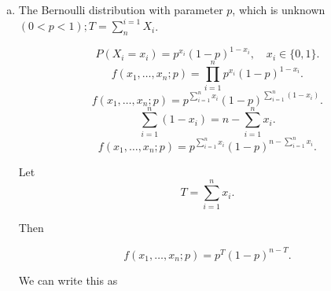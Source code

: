 \documentclass{article}
\begin{document}
\begin{enumerate}[(a)]
	\item The Bernoulli distribution with parameter $p$, which is unknown $(0<p<1); T= \sum_{n}^{i=1}X_i$.

	      \[
		      P(X_i = x_i) = p^{x_i}(1-p)^{1-x_i},
		      \quad x_i \in \{0,1\}.
	      \]
	      \[
		      f(x_1,\dots,x_n; p)
		      = \prod_{i=1}^{n} p^{x_i}(1-p)^{1-x_i}.
	      \]
	      \[
		      f(x_1,\dots,x_n; p)
		      = p^{\sum_{i=1}^{n} x_i}
		      (1-p)^{\sum_{i=1}^{n} (1-x_i)}.
	      \]
	      \[
		      \sum_{i=1}^{n} (1-x_i)
		      = n - \sum_{i=1}^{n} x_i.
	      \]
	      \[
		      f(x_1,\dots,x_n; p)
		      = p^{\sum_{i=1}^{n} x_i}
		      (1-p)^{n - \sum_{i=1}^{n} x_i}.
	      \]

	      Let
	      \[
		      T = \sum_{i=1}^{n} x_i.
	      \]

	      Then

	      \[
		      f(x_1,\dots,x_n; p)
		      = p^{T}(1-p)^{n-T}.
	      \]

	      We can write this as


\end{enumerate}
\end{document}
